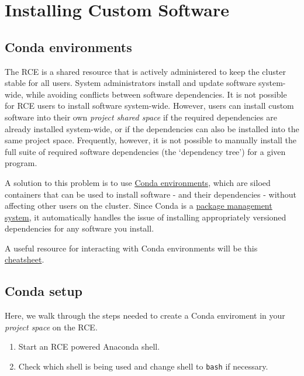 \documentclass[
]{book}
\providecommand{\tightlist}{%
  \setlength{\itemsep}{0pt}\setlength{\parskip}{0pt}}
\begin{document}
\hypertarget{installing-custom-software}{%
\chapter{Installing Custom Software}\label{installing-custom-software}}

\hypertarget{conda-environments}{%
\section{Conda environments}\label{conda-environments}}

The RCE is a shared resource that is actively administered to keep the cluster stable for all users. System administrators install and update software system-wide, while avoiding conflicts between software dependencies. It is not possible for RCE users to install software system-wide. However, users can install custom software into their own \emph{project shared space} if the required dependencies are already installed system-wide, or if the dependencies can also be installed into the same project space. Frequently, however, it is not possible to manually install the full suite of required software dependencies (the `dependency tree') for a given program.

A solution to this problem is to use \href{https://docs.conda.io/projects/conda/en/latest/user-guide/concepts/environments.html}{Conda environments}, which are siloed containers that can be used to install software - and their dependencies - without affecting other users on the cluster. Since Conda is a \href{https://en.wikipedia.org/wiki/Package_manager}{package management system}, it automatically handles the issue of installing appropriately versioned dependencies for any software you install.

A useful resource for interacting with Conda environments will be this \href{https://docs.conda.io/projects/conda/en/4.6.0/_downloads/52a95608c49671267e40c689e0bc00ca/conda-cheatsheet.pdf}{cheatsheet}.

\hypertarget{conda-setup}{%
\section{Conda setup}\label{conda-setup}}

Here, we walk through the steps needed to create a Conda enviroment in your \emph{project space} on the RCE.

\begin{enumerate}
\def\labelenumi{\arabic{enumi}.}
\tightlist
\item
  Start an RCE powered Anaconda shell.
\item
  Check which shell is being used and change shell to \texttt{bash} if necessary.
\end{enumerate}
\end{document}
